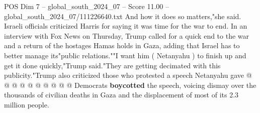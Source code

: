 \begin{textsample}{POS Dim 7 – global\_south\_2024\_07 – Score 11.00 – global\_south\_2024\_07/111226640.txt}
And how it does so matters,"she said.
Israeli officials criticized Harris for saying it was time for the war to end.
In an interview with Fox News on Thursday, Trump called for a quick end to the war and a return of the hostages Hamas holds in Gaza, adding that Israel has to better manage its"public relations.""I want him ( Netanyahu ) to finish up and get it done quickly,"Trump said."They are getting decimated with this publicity."Trump also criticized those who protested a speech Netanyahu gave @ @ @ @ @ @ @ @ @ @ Democrats \textbf{boycotted} the speech, voicing dismay over the thousands of civilian deaths in Gaza and the displacement of most of its 2.3 million people.

\end{textsample}
